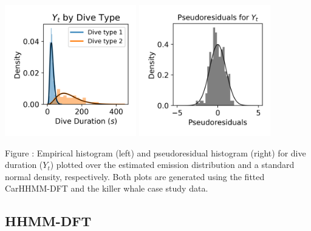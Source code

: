 \documentclass{article}
\begin{document}
        \begin{center}
        \includegraphics[width=2.25in]{../Plots/2019/20190902-182840-CATs_OB_1_0_267_CarHHMM2_empirical_hist_dive_duration.png}
        \includegraphics[width=2.25in]{../Plots/2019/20190902-182840-CATs_OB_1_0_267_CarHHMM2_pseudresids_Dive_Duration.png}
        \end{center}
        
        \noindent Figure : Empirical histogram (left) and pseudoresidual histogram (right) for dive duration ($Y_{t}$) plotted over the estimated emission distribution and a standard normal density, respectively. Both plots are generated using the fitted CarHHMM-DFT and the killer whale case study data.
        \addtocounter{fignum}{1}
        
        \subsection{HHMM-DFT}
        
\end{document}
